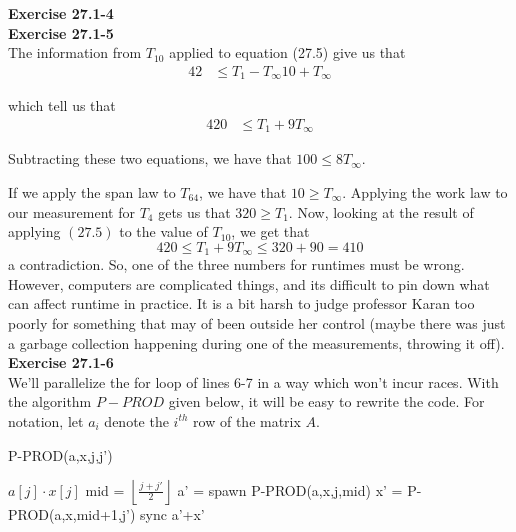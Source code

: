 \documentclass{article}
\begin{document}
\noindent\textbf{Exercise 27.1-4}\\


\noindent\textbf{Exercise 27.1-5}\\

The information from $T_{10}$ applied to equation (27.5) give us that
\begin{align*}
42 &\le {T_1 - T_\infty}{10} + T_\infty
\end{align*}

which tell us that 
\begin{align*}
420 &\le T_1 +9 T_\infty
\end{align*}


Subtracting these two equations, we have that $100 \le 8 T_\infty$.

If we apply the span law to $T_64$, we have that $10\ge T_\infty$. Applying the work law to our measurement for $T_4$ gets us that $320 \ge  T_1$. Now, looking at the result of applying $(27.5)$ to the value of $T_10$, we get that
\[
420 \le T_1 + 9T_\infty \le 320 + 90 = 410
\]
a contradiction. So, one of the three numbers for runtimes must be wrong. However, computers are complicated things, and its difficult to pin down what can affect runtime in practice. It is a bit harsh to judge professor Karan too poorly for something that may of been outside her control (maybe there was just a garbage collection happening during one of the measurements, throwing it off).\\

\noindent\textbf{Exercise 27.1-6}\\

We'll parallelize the for loop of lines 6-7 in a way which won't incur races.  With the algorithm $P-PROD$ given below, it will be easy to rewrite the code.  For notation, let $a_i$ denote the $i^{th}$ row of the matrix $A$.

\begin{algorithm}
\caption{P-PROD(a,x,j,j')}
\begin{algorithmic}[1]
\State \Return  $a[j] \cdot x[j]$
\EndIf
\State mid = $\left\lfloor \frac{j+j'}{2}\right\rfloor$
\State a' = spawn P-PROD(a,x,j,mid)
\State x' = P-PROD(a,x,mid+1,j')
\State sync
\State \Return a'+x'
\end{algorithmic}
\end{algorithm}
\end{document}
